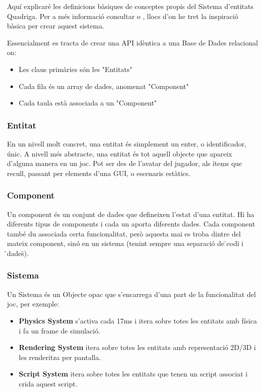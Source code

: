 Aquí explicaré les definicions bàsiques de conceptes propis del Sistema d'entitats Quadriga. Per a més informació consultar \cite{EntityWikiB} o \cite{Martin07}, llocs d'on he tret la inspiració bàsica per crear aquest sistema.

Essencialment es tracta de crear una API idèntica a una Base de Dades relacional on:

\begin{itemize}
  \item Les claus primàries són les "Entitats"
  \item Cada fila és un array de dades, anomenat "Component"
  \item Cada taula està associada a un "Component"
\end{itemize}

\subsubsection{Entitat}

En un nivell molt concret, una entitat és simplement un enter, o identificador, únic. A nivell més abstracte, una entitat és tot aquell objecte que apareix d'alguna manera en un joc. Pot ser des de l'avatar del jugador, als ítems que recull, passant per elements d'una GUI, o escenaris estàtics.

\subsubsection{Component}

Un component és un conjunt de dades que defineixen l'estat d'una entitat. Hi ha diferents tipus de components i cada un aporta diferents dades. Cada component també du associada certa funcionalitat, però aquesta mai es troba dintre del mateix component, sinó en un sistema (tenint sempre una separació de \"{}codi\"{} i \"{}dades\"{}).

\subsubsection{Sistema}

Un Sistema és un Objecte opac que s'encarrega d'una part de la funcionalitat del joc, per exemple:
\begin{itemize}
  \item{\bf Physics System} s'activa cada 17ms i itera sobre totes les entitats amb física i fa un frame de simulació.
  \item{\bf Rendering System} itera sobre totes les entitats amb representació 2D/3D i les renderitza per pantalla.
  \item{\bf Script System} itera sobre totes les entitats que tenen un script associat i crida aquest script.
\end{itemize}

